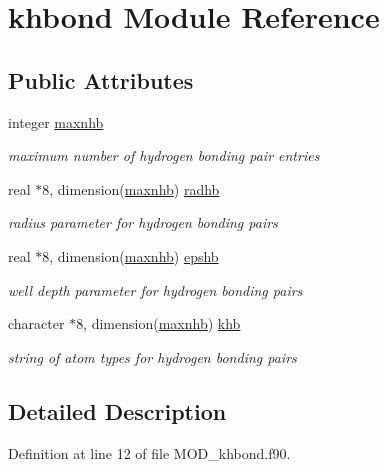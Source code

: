 \hypertarget{classkhbond}{\section{khbond Module Reference}
\label{classkhbond}
}
\subsection*{Public Attributes}
\begin{DoxyCompactItemize}
\item 
integer \hyperlink{classkhbond_a1cf7918050308a08750c9a028c481185}{maxnhb}
\begin{DoxyCompactList}\small\item\em maximum number of hydrogen bonding pair entries \end{DoxyCompactList}\item 
real $\ast$8, dimension(\hyperlink{classkhbond_a1cf7918050308a08750c9a028c481185}{maxnhb}) \hyperlink{classkhbond_a21c2374dfa5b426583f62e2970deb95b}{radhb}
\begin{DoxyCompactList}\small\item\em radius parameter for hydrogen bonding pairs \end{DoxyCompactList}\item 
real $\ast$8, dimension(\hyperlink{classkhbond_a1cf7918050308a08750c9a028c481185}{maxnhb}) \hyperlink{classkhbond_a8661d177bc836a31a9864dbb965881f0}{epshb}
\begin{DoxyCompactList}\small\item\em well depth parameter for hydrogen bonding pairs \end{DoxyCompactList}\item 
character $\ast$8, dimension(\hyperlink{classkhbond_a1cf7918050308a08750c9a028c481185}{maxnhb}) \hyperlink{classkhbond_aa1d21ba43bdcd5ecfefd1898c3767af7}{khb}
\begin{DoxyCompactList}\small\item\em string of atom types for hydrogen bonding pairs \end{DoxyCompactList}\end{DoxyCompactItemize}


\subsection{Detailed Description}


Definition at line 12 of file M\-O\-D\-\_\-khbond.\-f90.



